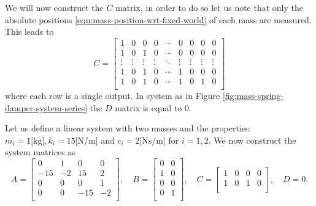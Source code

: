 We will now construct the $C$ matrix, in order to do so let us note that only the absolute positions \eqref{eqn:mass-position-wrt-fixed-world} of each mass are measured. This leads to
\begin{equation}\label{eqn:msd-C}
    C = 
    \begin{bmatrix}
        1 & 0 & 0 & 0 & \cdots & 0 & 0 & 0 & 0 \\
        1 & 0 & 1 & 0 & \cdots & 0 & 0 & 0 & 0 \\
        \vdots & \vdots & \vdots & \vdots & \ddots & \vdots & \vdots & \vdots & \vdots \\
        1 & 0 & 1 & 0 & \cdots & 1 & 0 & 0 & 0 \\
        1 & 0 & 1 & 0 & \cdots & 1 & 0 & 1 & 0 \\
    \end{bmatrix}
\end{equation}
where each row is a single output. In system as in Figure \ref{fig:mass-spring-damper-system-series} the $D$ matrix is equal to $0$.
\begin{example}\label{ex:system}
    Let us define a linear system with two masses and the properties: $m_i=1 \text{[kg]}, k_i=15\text{[N/m]}$ and $c_i=2 \text{[Ns/m]}$ for $i=1,2$. We now construct the system matrices as
    \begin{equation}\label{eqn:example-system}
    A =
    \begin{bmatrix}
        0 & 1 & 0 & 0 \\
        -15 & -2 & 15 & 2 \\
        0 & 0 & 0 & 1 \\
        0 & 0 & -15 & -2 \\
    \end{bmatrix}, \quad
    B = 
    \begin{bmatrix}
        0 & 0 \\
        1 & 0 \\
        0 & 0 \\
        0 & 1 \\
    \end{bmatrix}, \quad
    C =
    \begin{bmatrix}
        1 & 0 & 0 & 0 \\
        1 & 0 & 1 & 0 \\
    \end{bmatrix}, \quad
    D = 0.
    \end{equation}
\end{example}